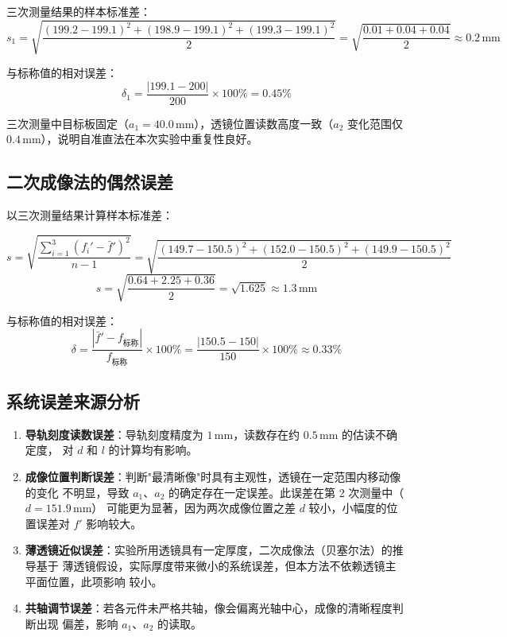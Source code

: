 \documentclass[12pt, a4paper]{article}
\begin{document}
三次测量结果的样本标准差：
\begin{equation}
  s_1 = \sqrt{\frac{(199.2-199.1)^2+(198.9-199.1)^2+(199.3-199.1)^2}{2}}
       = \sqrt{\frac{0.01+0.04+0.04}{2}} \approx 0.2\,\text{mm}
\end{equation}

与标称值的相对误差：
\begin{equation}
  \delta_1 = \frac{|199.1-200|}{200}\times100\% = 0.45\%
\end{equation}

三次测量中目标板固定（$a_1 = 40.0\,\text{mm}$），透镜位置读数高度一致（$a_2$ 变化范围仅
$0.4\,\text{mm}$），说明自准直法在本次实验中重复性良好。

\subsection{二次成像法的偶然误差}

以三次测量结果计算样本标准差：

\begin{equation}
  s = \sqrt{\frac{\sum_{i=1}^{3}(f_i' - \bar{f}')^2}{n-1}}
    = \sqrt{\frac{(149.7-150.5)^2 + (152.0-150.5)^2 + (149.9-150.5)^2}{2}}
\end{equation}
\begin{equation}
  s = \sqrt{\frac{0.64 + 2.25 + 0.36}{2}} = \sqrt{1.625} \approx 1.3\,\text{mm}
\end{equation}

与标称值的相对误差：
\begin{equation}
  \delta = \frac{|\bar{f}' - f_{\text{标称}}|}{f_{\text{标称}}} \times 100\%
          = \frac{|150.5 - 150|}{150} \times 100\% \approx 0.33\%
\end{equation}

\subsection{系统误差来源分析}

\begin{enumerate}
  \item \textbf{导轨刻度读数误差}：导轨刻度精度为 $1\,\text{mm}$，读数存在约 $0.5\,\text{mm}$ 的估读不确定度，
        对 $d$ 和 $l$ 的计算均有影响。
  \item \textbf{成像位置判断误差}：判断"最清晰像"时具有主观性，透镜在一定范围内移动像的变化
        不明显，导致 $a_1$、$a_2$ 的确定存在一定误差。此误差在第 2 次测量中（$d = 151.9\,\text{mm}$）
        可能更为显著，因为两次成像位置之差 $d$ 较小，小幅度的位置误差对 $f'$ 影响较大。
  \item \textbf{薄透镜近似误差}：实验所用透镜具有一定厚度，二次成像法（贝塞尔法）的推导基于
        薄透镜假设，实际厚度带来微小的系统误差，但本方法不依赖透镜主平面位置，此项影响
        较小。
  \item \textbf{共轴调节误差}：若各元件未严格共轴，像会偏离光轴中心，成像的清晰程度判断出现
        偏差，影响 $a_1$、$a_2$ 的读取。
\end{enumerate}
\end{document}
